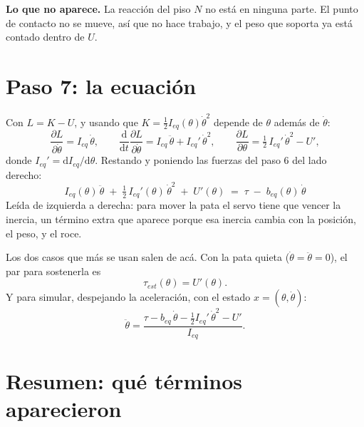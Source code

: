 \documentclass[11pt,a4paper]{article}
\newcommand{\dd}{\mathrm{d}}
\begin{document}
\textbf{Lo que no aparece.} La reacción del piso \(N\) no está en ninguna parte. El punto de contacto no se
mueve, así que no hace trabajo, y el peso que soporta ya está contado dentro de \(U\).

\section{Paso 7: la ecuación}

Con \(L=K-U\), y usando que \(K=\tfrac12 I_{eq}(\theta)\dot\theta^2\) depende de \(\theta\) además de
\(\dot\theta\):
\begin{equation}
\frac{\partial L}{\partial\dot\theta}=I_{eq}\,\dot\theta,\qquad
\frac{\dd}{\dd t}\frac{\partial L}{\partial\dot\theta}=I_{eq}\,\ddot\theta+I_{eq}'\,\dot\theta^2,\qquad
\frac{\partial L}{\partial\theta}=\tfrac12\,I_{eq}'\,\dot\theta^2-U',
\label{eq:parciales}
\end{equation}
donde \(I_{eq}'=\dd I_{eq}/\dd\theta\). Restando y poniendo las fuerzas del paso 6 del lado derecho:
\begin{equation}
\boxed{\;
I_{eq}(\theta)\,\ddot\theta\;+\;\tfrac12\,I_{eq}'(\theta)\,\dot\theta^2\;+\;U'(\theta)
\;=\;\tau\;-\;b_{eq}(\theta)\,\dot\theta
\;}
\label{eq:final}
\end{equation}
Leída de izquierda a derecha: para mover la pata el servo tiene que vencer la inercia, un término extra que
aparece porque esa inercia cambia con la posición, el peso, y el roce.

Los dos casos que más se usan salen de acá. Con la pata quieta (\(\dot\theta=\ddot\theta=0\)), el par para
sostenerla es
\begin{equation}
\tau_{est}(\theta)=U'(\theta).
\label{eq:tauest}
\end{equation}
Y para simular, despejando la aceleración, con el estado \(x=(\theta,\dot\theta)\):
\begin{equation}
\ddot\theta=\frac{\tau-b_{eq}\,\dot\theta-\tfrac12 I_{eq}'\,\dot\theta^2-U'}{I_{eq}} .
\label{eq:estado}
\end{equation}

\section{Resumen: qué términos aparecieron}
\end{document}
